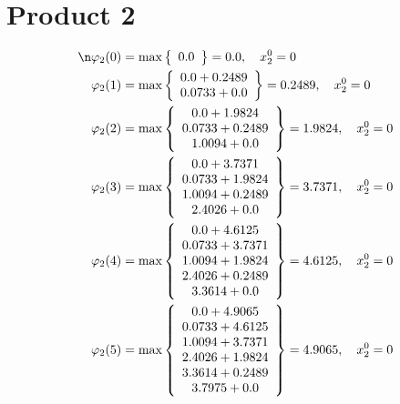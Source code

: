 \documentclass{article}
\begin{document}
\section{Product 2}
\begin{align*}
\n  
  
\varphi_{2}(0) &= \max \left\{ \begin{array}{c}
0.0
\end{array} \right\}=0.0,\quad x_{2}^0=0\\
  
  
  
  
\varphi_{2}(1) &= \max \left\{ \begin{array}{c}
0.0 + 0.2489 \\
 0.0733 + 0.0
\end{array} \right\}=0.2489,\quad x_{2}^0=0\\
  
  
  
  
\varphi_{2}(2) &= \max \left\{ \begin{array}{c}
0.0 + 1.9824 \\
 0.0733 + 0.2489 \\
 1.0094 + 0.0
\end{array} \right\}=1.9824,\quad x_{2}^0=0\\
  
  
  
  
\varphi_{2}(3) &= \max \left\{ \begin{array}{c}
0.0 + 3.7371 \\
 0.0733 + 1.9824 \\
 1.0094 + 0.2489 \\
 2.4026 + 0.0
\end{array} \right\}=3.7371,\quad x_{2}^0=0\\
  
  
  
  
\varphi_{2}(4) &= \max \left\{ \begin{array}{c}
0.0 + 4.6125 \\
 0.0733 + 3.7371 \\
 1.0094 + 1.9824 \\
 2.4026 + 0.2489 \\
 3.3614 + 0.0
\end{array} \right\}=4.6125,\quad x_{2}^0=0\\
  
  
  
  
\varphi_{2}(5) &= \max \left\{ \begin{array}{c}
0.0 + 4.9065 \\
 0.0733 + 4.6125 \\
 1.0094 + 3.7371 \\
 2.4026 + 1.9824 \\
 3.3614 + 0.2489 \\
 3.7975 + 0.0
\end{array} \right\}=4.9065,\quad x_{2}^0=0\\
  

\end{align*}
\end{document}
